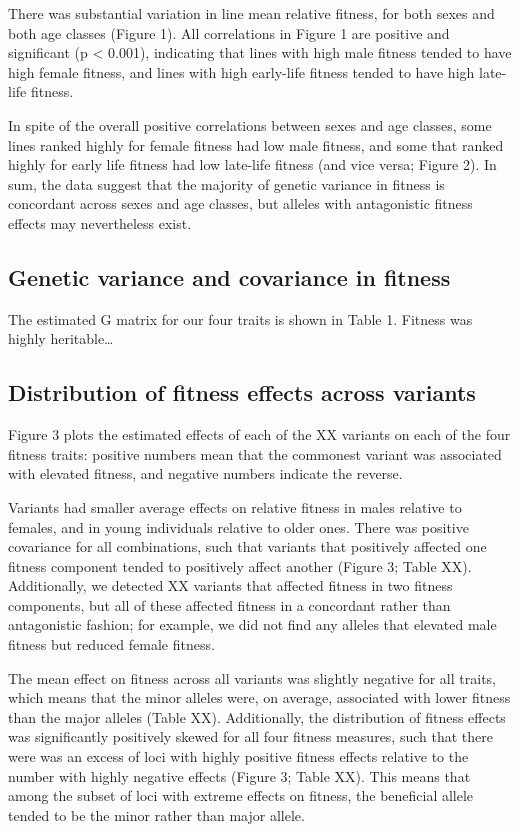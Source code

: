 \documentclass{article}
\begin{document}
There was substantial variation in line mean relative fitness, for both
sexes and both age classes (Figure 1). All correlations in Figure 1 are
positive and significant (p \textless{} 0.001), indicating that lines
with high male fitness tended to have high female fitness, and lines
with high early-life fitness tended to have high late-life fitness.

In spite of the overall positive correlations between sexes and age
classes, some lines ranked highly for female fitness had low male
fitness, and some that ranked highly for early life fitness had low
late-life fitness (and vice versa; Figure 2). In sum, the data suggest
that the majority of genetic variance in fitness is concordant across
sexes and age classes, but alleles with antagonistic fitness effects may
nevertheless exist.

\subsection*{Genetic variance and covariance in fitness}

The estimated G matrix for our four traits is shown in Table 1. Fitness
was highly heritable\ldots{}

\subsection*{Distribution of fitness effects across variants}

Figure 3 plots the estimated effects of each of the XX variants on each
of the four fitness traits: positive numbers mean that the commonest
variant was associated with elevated fitness, and negative numbers
indicate the reverse.

Variants had smaller average effects on relative fitness in males
relative to females, and in young individuals relative to older ones.
There was positive covariance for all combinations, such that variants
that positively affected one fitness component tended to positively
affect another (Figure 3; Table XX). Additionally, we detected XX
variants that affected fitness in two fitness components, but all of
these affected fitness in a concordant rather than antagonistic fashion;
for example, we did not find any alleles that elevated male fitness but
reduced female fitness.

The mean effect on fitness across all variants was slightly negative for
all traits, which means that the minor alleles were, on average,
associated with lower fitness than the major alleles (Table XX).
Additionally, the distribution of fitness effects was significantly
positively skewed for all four fitness measures, such that there were
was an excess of loci with highly positive fitness effects relative to
the number with highly negative effects (Figure 3; Table XX). This means
that among the subset of loci with extreme effects on fitness, the
beneficial allele tended to be the minor rather than major allele.
\end{document}
